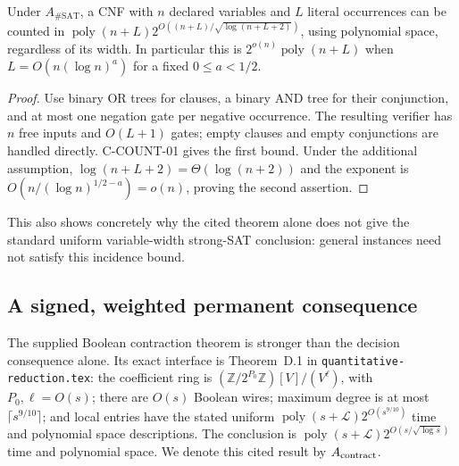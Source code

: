 \begin{corollary}
Under \(A_{\#\mathrm{SAT}}\), a CNF with \(n\) declared variables and
\(L\) literal occurrences can be counted in
\(\operatorname{poly}(n+L)2^{O((n+L)/\sqrt{\log(n+L+2)})}\), using
polynomial space, regardless of its width.  In particular this is
\(2^{o(n)}\operatorname{poly}(n+L)\) when
\(L=O(n(\log n)^a)\) for a fixed \(0\le a<1/2\).
\end{corollary}
\begin{proof}
Use binary OR trees for clauses, a binary AND tree for their conjunction,
and at most one negation gate per negative occurrence.  The resulting
verifier has \(n\) free inputs and \(O(L+1)\) gates; empty clauses and
empty conjunctions are handled directly.  C-COUNT-01 gives the first
bound.  Under the additional assumption,
\(\log(n+L+2)=\Theta(\log(n+2))\) and the exponent is
\(O(n/(\log n)^{1/2-a})=o(n)\), proving the second assertion.
\end{proof}

This also shows concretely why the cited theorem alone does not give the
standard uniform variable-width strong-SAT conclusion: general instances
need not satisfy this incidence bound.

\subsection{A signed, weighted permanent consequence}

The supplied Boolean contraction theorem is stronger than the decision
consequence alone.  Its exact interface is Theorem~D.1 in
\texttt{quantitative-reduction.tex}: the coefficient ring is
\((\mathbb Z/2^{P_0}\mathbb Z)[V]/(V^\ell)\), with \(P_0,\ell=O(s)\);
there are \(O(s)\) Boolean wires; maximum degree is at most
\(\lceil s^{9/10}\rceil\); and local entries have the stated uniform
\(\operatorname{poly}(s+\mathcal L)2^{O(s^{9/10})}\) time and polynomial
space descriptions.  The conclusion is
\(\operatorname{poly}(s+\mathcal L)2^{O(s/\sqrt{\log s})}\) time and
polynomial space.  We denote this cited result by \(A_{\rm contract}\).


